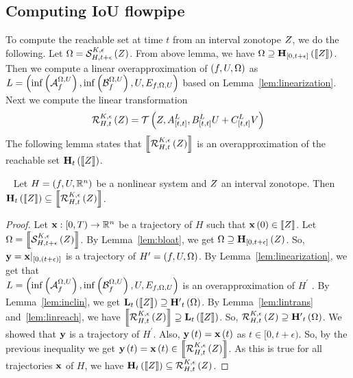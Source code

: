 \subsection{Computing IoU flowpipe}
To compute the reachable set at time $t$ from an interval zonotope
$Z$, we do the following.  Let $\Omega
= \mathcal{S}_{H,t+\epsilon}^{K,\epsilon}\left(Z\right)$.  From above lemma, we
have $\Omega\supseteq\mathbf{H}_{[0,t+\epsilon]}\left(\left\llbracket{Z}\right\rrbracket\right)$.  Then we
compute a linear overapproximation of $\left(f,U,\Omega\right)$ as\\ $L
= \left(\inf\left(\mathcal{A}_{f}^{\Omega,U}\right),
\inf\left(\mathcal{B}_{f}^{\Omega,U}\right),
U,
E_{f,\Omega,U}
\right)$ based on Lemma~\ref{lem:linearization}.  Next we compute the linear transformation
%
\[
\mathcal{R}_{H,t}^{K,\epsilon}\left(Z\right)
= \mathcal{T}\left(Z, {A}^{L}_{[t,t]},{B}^{L}_{[t,t]}U
+ {C}^{L}_{[t,t]}V \right)
\]
%
The following lemma states that $\left\llbracket{\mathcal{R}_{H,t}^{K,\epsilon}\left(Z\right)
}\right\rrbracket$ is an overapproximation of the reachable set
$\mathbf{H}_{t}\left(\left\llbracket{Z}\right\rrbracket\right)$.
%
\begin{lemma}~\label{lem:reachnonlin}
Let $H = \left(f,U,\mathbb{R}^n\right)$ be a nonlinear system and $Z$ an
interval zonotope.  Then
$\mathbf{H}_{t}\left(\left\llbracket{Z}\right\rrbracket\right) \subseteq \left\llbracket{\mathcal{R}_{H,t}^{K,\epsilon}\left(Z\right)}\right\rrbracket$.
\end{lemma}
%
\begin{proof}
Let $\mathbf{x}:[0,T)\rightarrow \mathbb{R}^n$ be a trajectory of $H$ such
that $\mathbf{x}\left(0\right)\in\left\llbracket{Z}\right\rrbracket$.  Let $\Omega
= \left\llbracket{\mathcal{S}_{H,t+\epsilon}^{K,\epsilon}\left(Z\right)}\right\rrbracket$.  By
Lemma~\ref{lem:bloat}, we get $\Omega\supseteq\mathbf{H}_{[0,t+\epsilon]}\left(Z\right)$.  So,
$\mathbf{y} = \mathbf{x}|_{[0,(t+\epsilon)]}$ is a trajectory of $H^\prime
= \left(f,U,\Omega\right)$.  By Lemma~\ref{lem:linearization}, we get that\\ $L
= \left(\inf\left(\mathcal{A}_{f}^{\Omega,U}\right),
\inf\left(\mathcal{B}_{f}^{\Omega,U}\right),
U,
E_{f,\Omega,U}
\right)$ is an overapproximation of $H^\prime$ .  By Lemma~\ref{lem:inclin},
we get
$\mathbf{L}_{t}\left(\left\llbracket{Z}\right\rrbracket\right)\supseteq\mathbf{H^\prime}_{t}\left(\Omega\right)$.  By
Lemma~\ref{lem:lintrans} and~\ref{lem:linreach}, we have
$\left\llbracket{\mathcal{R}_{H,t}^{K,\epsilon}\left(Z\right)}\right\rrbracket \supseteq \mathbf{L}_{t}\left(\left\llbracket{Z}\right\rrbracket\right)$.
So,
$\mathcal{R}_{H,t}^{K,\epsilon}\left(Z\right)\supseteq\mathbf{H^\prime}_{t}\left(\Omega\right)$.
We showed that $\mathbf{y}$ is a trajectory of $H^\prime$. Also,
$\mathbf{y}\left(t\right) =\mathbf{x}\left(t\right)$ as $t\in[0,t+\epsilon)$.  So, by the previous
inequality we get $\mathbf{y}\left(t\right)
= \mathbf{x}\left(t\right)\in\left\llbracket{\mathcal{R}_{H,t}^{K,\epsilon}\left(Z\right)}\right\rrbracket$.  As this is true
for all trajectories $\mathbf{x}$ of $H$, we have
$\mathbf{H}_{t}\left(\left\llbracket{Z}\right\rrbracket\right)\subseteq\mathcal{R}_{H,t}^{K,\epsilon}\left(Z\right)$.
\end{proof}
